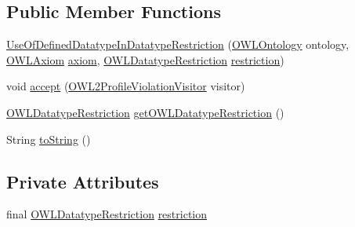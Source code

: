 \subsection*{Public Member Functions}
\begin{DoxyCompactItemize}
\item 
\hyperlink{classorg_1_1semanticweb_1_1owlapi_1_1profiles_1_1_use_of_defined_datatype_in_datatype_restriction_a4d5c46eec5d56b7766e8ae47a36a5ce1}{Use\-Of\-Defined\-Datatype\-In\-Datatype\-Restriction} (\hyperlink{interfaceorg_1_1semanticweb_1_1owlapi_1_1model_1_1_o_w_l_ontology}{O\-W\-L\-Ontology} ontology, \hyperlink{interfaceorg_1_1semanticweb_1_1owlapi_1_1model_1_1_o_w_l_axiom}{O\-W\-L\-Axiom} \hyperlink{classorg_1_1semanticweb_1_1owlapi_1_1profiles_1_1_o_w_l_profile_violation_aa7c8e8910ed3966f64a2c003fb516214}{axiom}, \hyperlink{interfaceorg_1_1semanticweb_1_1owlapi_1_1model_1_1_o_w_l_datatype_restriction}{O\-W\-L\-Datatype\-Restriction} \hyperlink{classorg_1_1semanticweb_1_1owlapi_1_1profiles_1_1_use_of_defined_datatype_in_datatype_restriction_a8f2c5c289b07829ecfbc88ab722a0a7c}{restriction})
\item 
void \hyperlink{classorg_1_1semanticweb_1_1owlapi_1_1profiles_1_1_use_of_defined_datatype_in_datatype_restriction_a28632e3cf20cd582ab01f6e5fc75a482}{accept} (\hyperlink{interfaceorg_1_1semanticweb_1_1owlapi_1_1profiles_1_1_o_w_l2_profile_violation_visitor}{O\-W\-L2\-Profile\-Violation\-Visitor} visitor)
\item 
\hyperlink{interfaceorg_1_1semanticweb_1_1owlapi_1_1model_1_1_o_w_l_datatype_restriction}{O\-W\-L\-Datatype\-Restriction} \hyperlink{classorg_1_1semanticweb_1_1owlapi_1_1profiles_1_1_use_of_defined_datatype_in_datatype_restriction_a503d4b29087ecdead8debe57b42740c2}{get\-O\-W\-L\-Datatype\-Restriction} ()
\item 
String \hyperlink{classorg_1_1semanticweb_1_1owlapi_1_1profiles_1_1_use_of_defined_datatype_in_datatype_restriction_a1d4c1c4bfc988010523cccb2537613c4}{to\-String} ()
\end{DoxyCompactItemize}
\subsection*{Private Attributes}
\begin{DoxyCompactItemize}
\item 
final \hyperlink{interfaceorg_1_1semanticweb_1_1owlapi_1_1model_1_1_o_w_l_datatype_restriction}{O\-W\-L\-Datatype\-Restriction} \hyperlink{classorg_1_1semanticweb_1_1owlapi_1_1profiles_1_1_use_of_defined_datatype_in_datatype_restriction_a8f2c5c289b07829ecfbc88ab722a0a7c}{restriction}
\end{DoxyCompactItemize}


